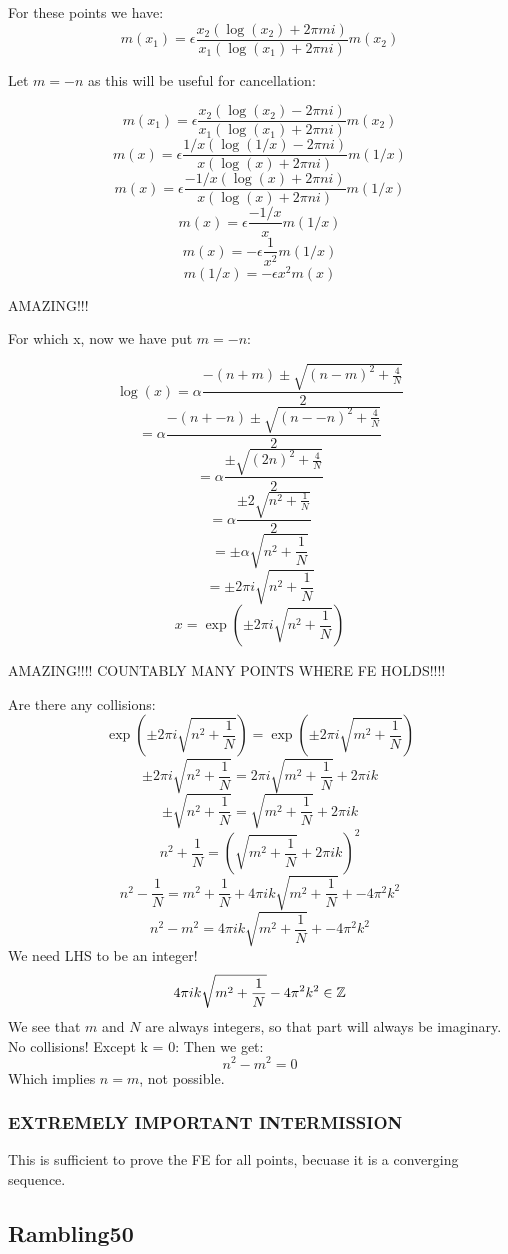\documentclass[a4paper]{amsart}
\begin{document}
For these points we have:
$$m(x_1) = \epsilon\frac{x_2(\log(x_2) + 2\pi m i)}{x_1(\log(x_1) + 2\pi n i)}m(x_2)$$


Let $m = -n$ as this will be useful for cancellation:

$$m(x_1) = \epsilon\frac{x_2(\log(x_2) - 2\pi n i)}{x_1(\log(x_1) + 2\pi n i)}m(x_2)$$
$$m(x) = \epsilon\frac{1/x(\log(1/x) - 2\pi n i)}{x(\log(x) + 2\pi n i)}m(1/x)$$
$$m(x) = \epsilon\frac{-1/x(\log(x) + 2\pi n i)}{x(\log(x) + 2\pi n i)}m(1/x)$$
$$m(x) = \epsilon\frac{-1/x}{x}m(1/x)$$
$$m(x) = -\epsilon\frac{1}{x^2}m(1/x)$$
$$m(1/x) = -\epsilon x^2m(x)$$


AMAZING!!!

For which x, now we have put $m = -n$:

$$\log(x) = \alpha\frac{-(n + m) \pm \sqrt{(n - m)^2 + \frac{4}{N}}}{2}$$
$$ = \alpha\frac{-(n + -n) \pm \sqrt{(n - -n)^2 + \frac{4}{N}}}{2}$$
$$ = \alpha\frac{\pm \sqrt{(2n)^2 + \frac{4}{N}}}{2}$$
$$ = \alpha\frac{\pm 2\sqrt{n^2 + \frac{1}{N}}}{2}$$
$$ = \pm \alpha\sqrt{n^2 + \frac{1}{N}}$$
$$ = \pm 2\pi i\sqrt{n^2 + \frac{1}{N}}$$
$$x = \exp(\pm 2\pi i\sqrt{n^2 + \frac{1}{N}})$$


AMAZING!!!! COUNTABLY MANY POINTS WHERE FE HOLDS!!!!

Are there any collisions:
$$\exp(\pm 2\pi i\sqrt{n^2 + \frac{1}{N}}) = \exp(\pm 2\pi i\sqrt{m^2 + \frac{1}{N}})$$
$$\pm 2\pi i\sqrt{n^2 + \frac{1}{N}} = 2\pi i\sqrt{m^2 + \frac{1}{N}} + 2\pi i k$$
$$\pm \sqrt{n^2 + \frac{1}{N}} = \sqrt{m^2 + \frac{1}{N}} + 2\pi i k$$
$$n^2 + \frac{1}{N} = (\sqrt{m^2 + \frac{1}{N}} + 2\pi i k)^2$$
$$n^2 - \frac{1}{N} = m^2 + \frac{1}{N} + 4\pi i k\sqrt{m^2 + \frac{1}{N}} + -4\pi^2k^2$$
$$n^2 - m^2 = 4\pi i k\sqrt{m^2 + \frac{1}{N}} + -4\pi^2k^2$$
We need LHS to be an integer!
$$4\pi i k\sqrt{m^2 + \frac{1}{N}} - 4\pi^2k^2 \in \mathbb{Z}$$
We see that $m$ and $N$ are always integers, so that part will always be imaginary. No collisions! Except k = 0: Then we get:
$$n^2 - m^2 = 0$$
Which implies $n = m$, not possible.


\subsubsection{EXTREMELY IMPORTANT INTERMISSION}

This is sufficient to prove the FE for all points, becuase it is a converging sequence.


\subsection{Rambling50}
\end{document}
